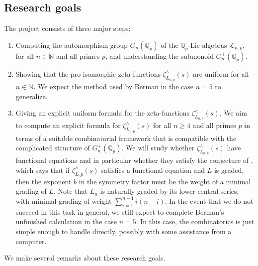 \documentclass[12pt]{article}
\begin{document}
\subsection{Research goals}
The project consists of three major steps:
\begin{enumerate}
\item
Computing the automorphism group $G_{n}(\mathbb{Q}_{p})$ of the $\mathbb{Q}_p$-Lie algebras $\mathcal{L}_{n,p}$, for all $n\in\mathbb{N}$ and all primes $p$, and understanding the submonoid $G_{n}^{+}(\mathbb{Q}_{p})$.
\item
Showing that the pro-isomorphic zeta-functions $\zeta_{L_{n,p}}^{\wedge}(s)$ are uniform for all $n\in\mathbb{N}$. We expect the method used by Berman in the case $n=5$ to generalize.
\item
Giving an explicit uniform formula for the zeta-functions $\zeta_{L_{n,p}}^{\wedge}(s)$.
We aim to compute an explicit formula for $\zeta_{L_{n,p}}^{\wedge}(s)$ for all $n \geq 4$ and all primes $p$ in terms of a suitable combinatorial framework that is compatible with the complicated structure of $G_{n}^{+}(\mathbb{Q}_p)$. We will study whether $\zeta_{L_{n,p}}^{\wedge}(s)$ have functional equations and in particular whether they satisfy the conjecture of \cite[Conjecture 1.8]{BermanKlopschOnn}, which says that if $\zeta_{L,p}^{\wedge}(s)$ satisfies a functional equation and $L$ is graded, then the exponent $b$ in the symmetry factor must be the weight of a minimal grading of $L$. Note that $L_{n}$ is naturally graded by its lower central series, with minimal grading of weight $\sum_{i=1}^{n-1}{i(n-i)}$. In the event that we do not succeed in this task in general, we still expect to complete Berman's unfinished calculation in the case $n=5$. In this case, the combinatorics is just simple enough to handle directly, possibly with some assistance from a computer.
\end{enumerate}
We make several remarks about these research goals.
\end{document}
